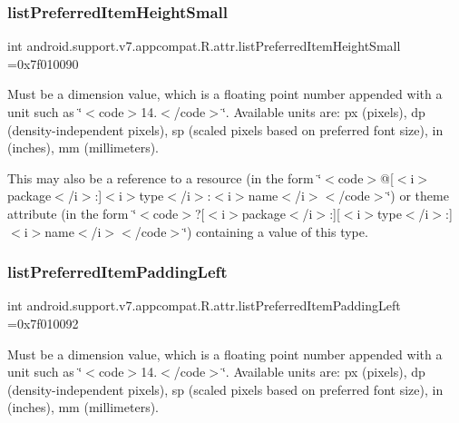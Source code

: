 \subsubsection{\texorpdfstring{list\+Preferred\+Item\+Height\+Small}{listPreferredItemHeightSmall}}
{\footnotesize\ttfamily int android.\+support.\+v7.\+appcompat.\+R.\+attr.\+list\+Preferred\+Item\+Height\+Small =0x7f010090\hspace{0.3cm}{\ttfamily [static]}}

Must be a dimension value, which is a floating point number appended with a unit such as \char`\"{}$<$code$>$14.\+5sp$<$/code$>$\char`\"{}. Available units are\+: px (pixels), dp (density-\/independent pixels), sp (scaled pixels based on preferred font size), in (inches), mm (millimeters). 

This may also be a reference to a resource (in the form \char`\"{}$<$code$>$@\mbox{[}$<$i$>$package$<$/i$>$\+:\mbox{]}$<$i$>$type$<$/i$>$\+:$<$i$>$name$<$/i$>$$<$/code$>$\char`\"{}) or theme attribute (in the form \char`\"{}$<$code$>$?\mbox{[}$<$i$>$package$<$/i$>$\+:\mbox{]}\mbox{[}$<$i$>$type$<$/i$>$\+:\mbox{]}$<$i$>$name$<$/i$>$$<$/code$>$\char`\"{}) containing a value of this type. \mbox{\label{classandroid_1_1support_1_1v7_1_1appcompat_1_1R_1_1attr_a5638fec2ab8bb6a2c4fa1e10cc96648a}} 
\subsubsection{\texorpdfstring{list\+Preferred\+Item\+Padding\+Left}{listPreferredItemPaddingLeft}}
{\footnotesize\ttfamily int android.\+support.\+v7.\+appcompat.\+R.\+attr.\+list\+Preferred\+Item\+Padding\+Left =0x7f010092\hspace{0.3cm}{\ttfamily [static]}}

Must be a dimension value, which is a floating point number appended with a unit such as \char`\"{}$<$code$>$14.\+5sp$<$/code$>$\char`\"{}. Available units are\+: px (pixels), dp (density-\/independent pixels), sp (scaled pixels based on preferred font size), in (inches), mm (millimeters). 

